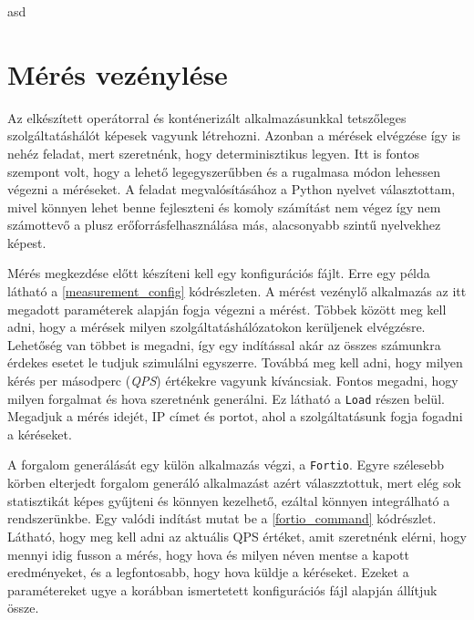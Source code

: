 asd

\section{Mérés vezénylése}
Az elkészített operátorral és konténerizált alkalmazásunkkal tetszőleges szolgáltatáshálót képesek vagyunk létrehozni.
Azonban a mérések elvégzése így is nehéz feladat, mert szeretnénk, hogy determinisztikus legyen. Itt is fontos szempont volt, hogy a lehető legegyszerűbben és a rugalmasa módon lehessen végezni a méréseket. 
A feladat megvalósításához a Python nyelvet választottam, mivel könnyen lehet benne fejleszteni és komoly számítást nem végez így nem számottevő a plusz erőforrásfelhasználása más, alacsonyabb szintű nyelvekhez képest. 

Mérés megkezdése előtt készíteni kell egy konfigurációs fájlt. Erre egy példa látható a \ref{measurement_config} kódrészleten. A mérést vezénylő alkalmazás az itt megadott paraméterek alapján fogja végezni a mérést. Többek között meg kell adni, hogy a mérések milyen szolgáltatáshálózatokon kerüljenek elvégzésre. Lehetőség van többet is megadni, így egy indítással akár az összes számunkra érdekes esetet le tudjuk szimulálni egyszerre. Továbbá meg kell adni, hogy milyen kérés per másodperc (\textit{QPS}) értékekre vagyunk kíváncsiak. Fontos megadni, hogy milyen forgalmat és hova szeretnénk generálni. Ez látható a \verb+Load+ részen belül. Megadjuk a mérés idejét, IP címet és portot, ahol a szolgáltatásunk fogja fogadni a kéréseket.\\


\lstset{caption=Mérés konfigurációja, label=measurement_config}


A forgalom generálását egy külön alkalmazás végzi, a \verb+Fortio+. Egyre szélesebb körben elterjedt forgalom generáló alkalmazást azért válaszztottuk, mert elég sok statisztikát képes gyűjteni és könnyen kezelhető, ezáltal könnyen integrálható a rendszerünkbe. Egy valódi indítást mutat be a  \ref{fortio_command} kódrészlet. 
Látható, hogy meg kell adni az aktuális QPS értéket, amit szeretnénk elérni, hogy mennyi idig fusson a mérés, hogy hova és milyen néven mentse a kapott eredményeket, és a legfontosabb, hogy hova küldje a kéréseket.
Ezeket a paramétereket ugye a korábban ismertetett konfigurációs fájl alapján állítjuk össze. \\

